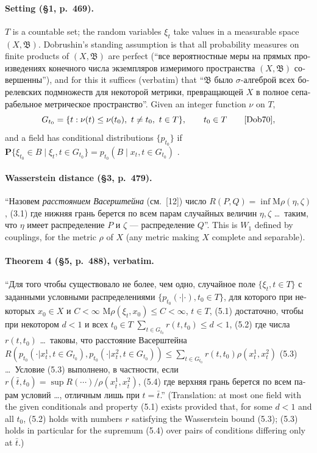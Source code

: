 \documentclass[11pt,a4paper]{article}
\theoremstyle{remark}
\theoremstyle{definition}
\newcommand{\ru}[1]{\foreignlanguage{russian}{#1}}
\begin{document}
\paragraph{Setting (\S1, p.~469).} $T$ is a countable set; the random variables $\xi_t$ take values in a
measurable space $(X,\mathfrak B)$. Dobrushin's standing assumption is that all probability measures on
finite products of $(X,\mathfrak B)$ are perfect (``\ru{все вероятностные меры на прямых произведениях
конечного числа экземпляров измеримого пространства $(X,\mathfrak B)$ совершенны}''), and for this it
suffices (verbatim) that
``\ru{$\mathfrak B$ было $\sigma$-алгеброй всех борелевских подмножеств для некоторой метрики,
превращающей $X$ в полное сепарабельное метрическое пространство}''.
Given an integer function $\nu$ on $T$,
\begin{equation*}
G_{t_0}=\{t:\nu(t)\le\nu(t_0),\ t\neq t_0,\ t\in T\},\qquad t_0\in T \qquad\text{\cite[(1.2)]{Dob70}},
\end{equation*}
and a field has conditional distributions $\{p_{t_0}\}$ if
$\mathbf P\{\xi_{t_0}\in B\mid\xi_t,t\in G_{t_0}\}=p_{t_0}(B\mid x_t,t\in G_{t_0})$ \cite[(1.3)]{Dob70}.

\paragraph{Wasserstein distance (\S3, p.~479).}
``\ru{Назовем \emph{расстоянием Васерштейна} (см.~[12]) число}
$R(P,Q)=\inf \mathrm{M}\rho(\eta,\zeta)$, (3.1)
\ru{где нижняя грань берется по всем парам случайных величин $\eta,\zeta$ \dots\ таким, что $\eta$ имеет
распределение $P$ и $\zeta$ --- распределение $Q$}''. This is $W_1$ defined by couplings, for the metric
$\rho$ of $X$ (any metric making $X$ complete and separable).

\paragraph{Theorem 4 (\S5, p.~488), verbatim.}
``\ru{Для того чтобы существовало не более, чем одно, случайное поле $\{\xi_t, t\in T\}$ с заданными
условными распределениями $\{p_{t_0}(\cdot|\cdot), t_0\in T\}$, для которого при некоторых $x_0\in X$ и
$C<\infty$}
$\mathrm{M}\rho(\xi_t,x_0)\le C<\infty$, $t\in T$, (5.1)
\ru{достаточно, чтобы при некотором $d<1$ и всех $t_0\in T$}
$\sum_{t\in G_{t_0}} r(t,t_0)\le d<1$, (5.2)
\ru{где числа $r(t,t_0)$ \dots\ таковы, что расстояние Васерштейна}
$R(p_{t_0}(\cdot|x^1_t,t\in G_{t_0}),p_{t_0}(\cdot|x^2_t,t\in G_{t_0}))\le\sum_{t\in G_{t_0}}r(t,t_0)\rho(x^1_t,x^2_t)$ (5.3)
\ru{\dots\ Условие (5.3) выполнено, в частности, если}
$r(\bar t,t_0)=\sup R(\cdots)/\rho(x^1_{\bar t},x^2_{\bar t})$, (5.4)
\ru{где верхняя грань берется по всем парам условий \dots, отличным лишь при $t=\bar t$}.''
(Translation: at most one field with the given conditionals and property (5.1) exists provided that, for
some $d<1$ and all $t_0$, (5.2) holds with numbers $r$ satisfying the Wasserstein bound (5.3); (5.3)
holds in particular for the supremum (5.4) over pairs of conditions differing only at $\bar t$.)
\end{document}

